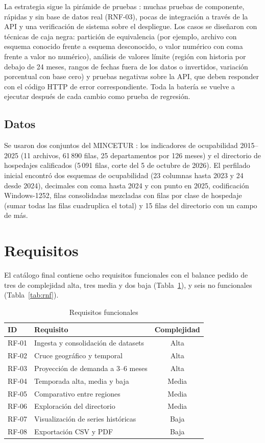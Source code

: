\documentclass[conference]{IEEEtran}
\begin{document}
La estrategia sigue la pirámide de pruebas \cite{istqb2023}: muchas pruebas de componente, rápidas y sin base de datos real (RNF-03), pocas de integración a través de la API y una verificación de sistema sobre el despliegue. Los casos se diseñaron con técnicas de caja negra: partición de equivalencia (por ejemplo, archivo con esquema conocido frente a esquema desconocido, o valor numérico con coma frente a valor no numérico), análisis de valores límite (región con historia por debajo de 24 meses, rangos de fechas fuera de los datos o invertidos, variación porcentual con base cero) y pruebas negativas sobre la API, que deben responder con el código HTTP de error correspondiente. Toda la batería se vuelve a ejecutar después de cada cambio como prueba de regresión.

\subsection{Datos}
Se usaron dos conjuntos del MINCETUR \cite{pnda}: los indicadores de ocupabilidad 2015--2025 (11 archivos, 61\,890 filas, 25 departamentos por 126 meses) y el directorio de hospedajes calificados (5\,091 filas, corte del 5 de octubre de 2026). El perfilado inicial encontró dos esquemas de ocupabilidad (23 columnas hasta 2023 y 24 desde 2024), decimales con coma hasta 2024 y con punto en 2025, codificación Windows-1252, filas consolidadas mezcladas con filas por clase de hospedaje (sumar todas las filas cuadruplica el total) y 15 filas del directorio con un campo de más.

\section{Requisitos}\label{sec:requisitos}
El catálogo final contiene ocho requisitos funcionales con el balance pedido de tres de complejidad alta, tres media y dos baja (Tabla~\ref{tab:rf}), y seis no funcionales (Tabla~\ref{tab:rnf}).

\begin{table}[t]
\caption{Requisitos funcionales}\label{tab:rf}
\centering
\begin{tabular}{@{}llc@{}}
\toprule
ID & Requisito & Complejidad \\
\midrule
RF-01 & Ingesta y consolidación de datasets & Alta \\
RF-02 & Cruce geográfico y temporal & Alta \\
RF-03 & Proyección de demanda a 3--6 meses & Alta \\
RF-04 & Temporada alta, media y baja & Media \\
RF-05 & Comparativo entre regiones & Media \\
RF-06 & Exploración del directorio & Media \\
RF-07 & Visualización de series históricas & Baja \\
RF-08 & Exportación CSV y PDF & Baja \\
\bottomrule
\end{tabular}
\end{table}
\end{document}
